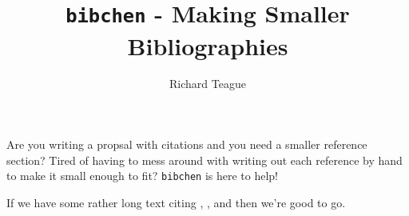 \documentclass[a4paper, 12pt]{article}
\title{\texttt{bibchen} - Making Smaller Bibliographies}
\author{Richard Teague}
\begin{document}
\maketitle{}

Are you writing a propsal with citations and you need a smaller reference section? Tired of having to mess around with writing out each reference by hand to make it small enough to fit? \texttt{bibchen} is here to help!

If we have some rather long text citing \cite{Teague_ea_2018}, \cite{Teague_ea_2017}, \cite{Teague_ea_2016} and \citet{Teague_ea_2015} then we're good to go.


{}
\end{document}
